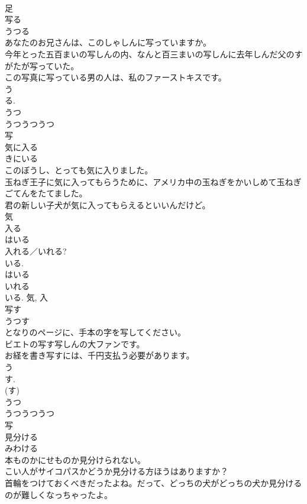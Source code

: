 \documentclass[8pt]{extreport}
\begin{document}
\begin{CJK}{UTF8}{min}
\\	足	
\\	写る	
\\	うつる	
\\	あなたのお兄さんは、このしゃしんに写っていますか。	
\\	今年とった五百まいの写しんの内、なんと百三まいの写しんに去年しんだ父のすがたが写っていた。	
\\	この写真に写っている男の人は、私のファーストキスです。	
\\	う 
\\	る. 
\\	うつ 
\\	うつうつうつ 
\\	写	
\\	気に入る	
\\	きにいる	
\\	このぼうし、とっても気に入りました。	
\\	玉ねぎ王子に気に入ってもらうために、アメリカ中の玉ねぎをかいしめて玉ねぎごてんをたてました。	
\\	君の新しい子犬が気に入ってもらえるといいんだけど。	
\\	気 
\\	入る 
\\	はいる 
\\	入れる／いれる? 
\\	いる. 
\\	はいる 
\\	いれる 
\\	いる.	気, 入	
\\	写す	
\\	うつす	
\\	となりのページに、手本の字を写してください。	
\\	ビエトの写す写しんの大ファンです。	
\\	お経を書き写すには、千円支払う必要があります。	
\\	う 
\\	す. 
\\	(す) 
\\	うつ 
\\	うつうつうつ 
\\	写	
\\	見分ける	
\\	みわける	
\\	本ものかにせものか見分けられない。	
\\	こい人がサイコパスかどうか見分ける方ほうはありますか？	
\\	首輪をつけておくべきだったよね。だって、どっちの犬がどっちの犬か見分けるのが難しくなっちゃったよ。	

\end{CJK}
\end{document}
